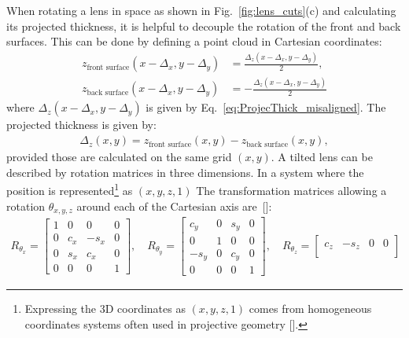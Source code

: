 \begin{refsection}
When rotating a lens in space as shown in Fig.~\ref{fig:lens_cuts}(c) and calculating its projected thickness, it is helpful to decouple the rotation of the front and back surfaces. This can be done by defining a point cloud in Cartesian coordinates:
\begin{subequations}\label{eq:point_cloud}
    \begin{align}
    z_\text{front surface}(x-\Delta_x,y-\Delta_y) &=\frac{\Delta_z(x-\Delta_x,y-\Delta_y)}{2},\\
    z_\text{back surface}(x-\Delta_x,y-\Delta_y) &= -\frac{\Delta_z(x-\Delta_x,y-\Delta_y)}{2}
    \end{align}
\end{subequations}{}
where $\Delta_z(x-\Delta_x,y-\Delta_y)$ is given by Eq.~\ref{eq:ProjecThick_misaligned}. The projected thickness is given by:
\begin{align}\label{eq:point_cloud_thickness}
    \Delta_z(x,y) = z_\text{front surface}(x,y) - z_\text{back surface}(x,y),
\end{align}{}
provided those are calculated on the same grid $(x,y)$. A tilted lens can be described by rotation matrices in three dimensions. In a system where the position is represented\footnote{Expressing the 3D coordinates as $(x,y,z,1)$ comes from homogeneous coordinates systems often used in projective geometry [\cite{House2016}].} as $(x,y,z,1)$ The transformation matrices allowing a rotation $\theta_{x,y,z}$ around each of the Cartesian axis are~[\cite{House2016}]:
\begin{align}\label{eq:affine}
    R_{\theta_x}= \begin{bmatrix}
                        1 & 0 & 0 &0\\
                        0 & c_x & -s_x  &0\\
                        0 & s_x & c_x &0\\
                        0 & 0 & 0 &1
    \end{bmatrix} ,\quad
    R_{\theta_y} = \begin{bmatrix}
                    c_y & 0 & s_y &0\\
                    0 & 1 & 0 &0\\
                    -s_y & 0 & c_y &0\\
                    0 & 0 & 0 &1
    \end{bmatrix}  ,\quad
    R_{\theta_z} = \begin{bmatrix}
                    c_z & -s_z & 0 &0\\

\end{bmatrix}
\end{align}
\end{refsection}
